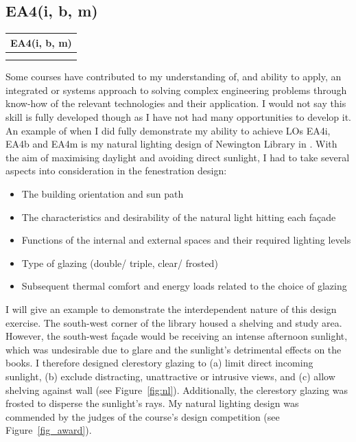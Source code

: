 \subsection*{EA4(i, b, m)}

\begin{table}
	\begin{tabular}{|ll|}
		\hline
		\multicolumn{2}{|c|}{\cellcolor[HTML]{F8A102}\textbf{EA4(i, b, m) \nomaster}} \\ \hline
		\CAS & \EnBldgs \\
		\PRJ & \WSD \\ \hline
	\end{tabular}
\end{table}

Some courses have contributed to my understanding of, and ability to apply, an integrated or systems approach to solving complex engineering problems through know-how of the relevant technologies and their application.
I would not say this skill is fully developed though as I have not had many opportunities to develop it.
An example of when I did fully demonstrate my ability to achieve LOs EA4i, EA4b and EA4m is my natural lighting design of Newington Library in \CASTitle.
With the aim of maximising daylight and avoiding direct sunlight, I had to take several aspects into consideration in the fenestration design:
\begin{itemize}
	\item The building orientation and sun path
	\item The characteristics and desirability of the natural light hitting each fa{\c{c}}ade
	\item Functions of the internal and external spaces and their required lighting levels
	\item Type of glazing (double/ triple, clear/ frosted)
	\item Subsequent thermal comfort and energy loads related to the choice of glazing
\end{itemize}


I will give an example to demonstrate the interdependent nature of this design exercise.
The south-west corner of the library housed a shelving and study area.
However, the south-west fa{\c{c}}ade would be receiving an intense afternoon sunlight, which was undesirable due to glare and the sunlight's detrimental effects on the books.
I therefore designed clerestory glazing to (a) limit direct incoming sunlight, (b) exclude distracting, unattractive or intrusive views, and (c) allow shelving against wall (see Figure~\ref{fig:nl}).
Additionally, the clerestory glazing was frosted to disperse the sunlight's rays.
My natural lighting design was commended by the judges of the course's design competition (see Figure~\ref{fig_award}).


